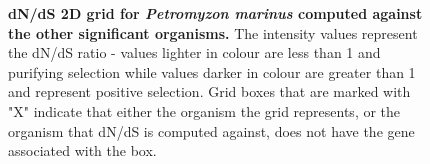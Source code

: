 \documentclass{article}
\begin{document}
\begin{figure}[H]
\centering
{}
\caption{\textbf{dN/dS 2D grid for \textit{Petromyzon marinus} computed against the other significant organisms.} The intensity values represent the dN/dS ratio - values lighter in colour are less than 1 and purifying selection while values darker in colour are greater than 1 and represent positive selection. Grid boxes that are marked with "X" indicate that either the organism the grid represents, or the organism that dN/dS is computed against, does not have the gene associated with the box.}
\label{sup_fig_32}
\end{figure}
\end{document}
